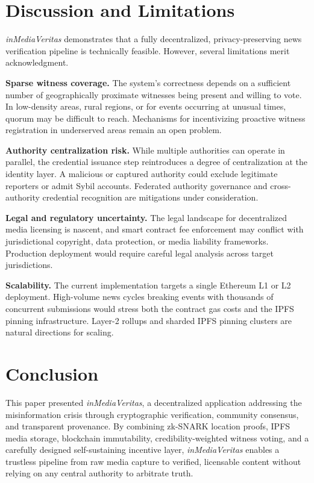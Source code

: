 \documentclass[11pt]{article}
\begin{document}
\section{Discussion and Limitations}

\textit{inMediaVeritas} demonstrates that a fully decentralized, privacy-preserving
news verification pipeline is technically feasible. However, several limitations
merit acknowledgment.

\textbf{Sparse witness coverage.} The system's correctness depends on a
sufficient number of geographically proximate witnesses being present and
willing to vote. In low-density areas, rural regions, or for events occurring
at unusual times, quorum may be difficult to reach. Mechanisms for incentivizing
proactive witness registration in underserved areas remain an open problem.

\textbf{Authority centralization risk.} While multiple authorities can operate
in parallel, the credential issuance step reintroduces a degree of centralization
at the identity layer. A malicious or captured authority could exclude legitimate
reporters or admit Sybil accounts. Federated authority governance and
cross-authority credential recognition are mitigations under consideration.

\textbf{Legal and regulatory uncertainty.} The legal landscape for decentralized
media licensing is nascent, and smart contract fee enforcement may conflict with
jurisdictional copyright, data protection, or media liability frameworks.
Production deployment would require careful legal analysis across target
jurisdictions.

\textbf{Scalability.} The current implementation targets a single Ethereum L1
or L2 deployment. High-volume news cycles breaking events with thousands of
concurrent submissions would stress both the contract gas costs and the IPFS
pinning infrastructure. Layer-2 rollups and sharded IPFS pinning clusters are
natural directions for scaling.

\section{Conclusion}

This paper presented \textit{inMediaVeritas}, a decentralized application
addressing the misinformation crisis through cryptographic verification,
community consensus, and transparent provenance. By combining zk-SNARK location
proofs, IPFS media storage, blockchain immutability, credibility-weighted witness
voting, and a carefully designed self-sustaining incentive layer,
\textit{inMediaVeritas} enables a trustless pipeline from raw media capture to
verified, licensable content without relying on any central authority to
arbitrate truth.
\end{document}

